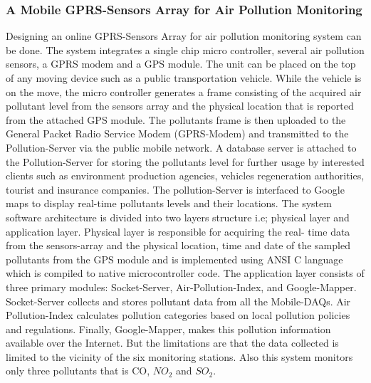 \subsubsection{A Mobile GPRS-Sensors Array for Air Pollution Monitoring \cite{25}}
Designing an online GPRS-Sensors Array for air pollution monitoring system can be done. The system integrates a single chip micro controller, several air pollution sensors, a GPRS modem and a GPS module. The unit can be placed on the top of any moving device such as a public transportation vehicle. While the vehicle is on the move, the micro controller generates a frame consisting of the acquired air pollutant level from the sensors array and the physical location that is reported from the attached GPS module. The pollutants frame is then uploaded to the General Packet Radio Service Modem (GPRS-Modem) and transmitted to the Pollution-Server via the public mobile network. A database server is attached to the Pollution-Server for storing the pollutants level for further usage by interested clients such as environment production agencies, vehicles regeneration authorities, tourist and insurance companies. The pollution-Server is interfaced to Google maps to display real-time pollutants levels and their locations. The system software architecture is divided into two layers structure i.e; physical layer and application layer. Physical layer is responsible for acquiring the real- time data from the sensors-array and the physical location, time and date of the sampled pollutants from the GPS module and is implemented using ANSI C language which is compiled to native microcontroller code. The application layer consists of three primary modules: Socket-Server, Air-Pollution-Index, and Google-Mapper. Socket-Server collects and stores pollutant data from all the Mobile-DAQs. Air Pollution-Index calculates pollution categories based on local pollution policies and regulations. Finally, Google-Mapper, makes this pollution information available over the Internet. But the limitations are that the data collected is limited to the vicinity of the six monitoring stations. Also this system monitors only three pollutants that is CO, $NO_2$ and $SO_2$.

